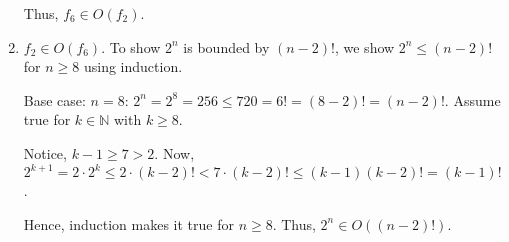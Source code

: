 \begin{soln}
\begin{enumerate}
		      Thus, \(f_6 \in O(f_2)\).



		\item \(f_2 \in O(f_6)\). To show \(2^n\) is bounded by \((n - 2)!\), we show \(2^n \leq (n-2)!\) for \(n \geq 8\) using induction.

		      Base case: \(n = 8\): \(2^n = 2^8 = 256 \leq 720 = 6! = (8 - 2)! = (n - 2)!\). Assume true for \(k \in \mathbb{N}\) with \(k \geq 8\).

		      Notice, \(k - 1 \geq 7 > 2\). Now, \(2^{k+1} =  2 \cdot 2^k \leq 2 \cdot (k - 2)! < 7 \cdot (k - 2)! \leq (k - 1)(k - 2)! = (k - 1)!\).

		      Hence, induction makes it true for \(n \geq 8\). Thus, \(2^n \in O((n - 2)!)\).
	\end{enumerate}

\end{soln}
